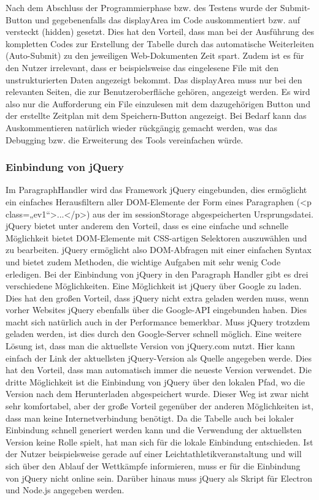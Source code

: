 {Nach dem Abschluss der Programmierphase bzw. des Testens wurde der Submit-Button und gegebenenfalls das displayArea im Code auskommentiert bzw. auf versteckt (hidden) gesetzt. Dies hat den Vorteil, dass man bei der Ausführung des kompletten Codes zur Erstellung der Tabelle durch das automatische Weiterleiten (Auto-Submit) zu den jeweiligen Web-Dokumenten Zeit spart. Zudem ist es für den Nutzer irrelevant, dass er beispielsweise das eingelesene File mit den unstrukturierten Daten angezeigt bekommt. Das displayArea muss nur bei den relevanten Seiten, die zur Benutzeroberfläche gehören, angezeigt werden. Es wird also nur die Aufforderung ein File einzulesen mit dem dazugehörigen Button und der erstellte Zeitplan mit dem Speichern-Button angezeigt. 
Bei Bedarf kann das Auskommentieren natürlich wieder rückgängig gemacht werden, was das Debugging bzw. die Erweiterung des Tools vereinfachen würde. 

\subsubsection{Einbindung von jQuery}
Im ParagraphHandler wird das Framework jQuery eingebunden, dies ermöglicht ein einfaches Herausfiltern aller DOM-Elemente der Form eines Paragraphen (<p class=„ev1“>...</p>) aus der im sessionStorage abgespeicherten Ursprungsdatei. jQuery bietet unter anderem den Vorteil, dass es eine einfache und schnelle Möglichkeit bietet DOM-Elemente mit CSS-artigen Selektoren auszuwählen und zu bearbeiten. jQuery ermöglicht also DOM-Abfragen mit einer einfachen Syntax und bietet zudem Methoden, die wichtige Aufgaben mit sehr wenig Code erledigen. Bei der Einbindung von jQuery in den Paragraph Handler gibt es drei verschiedene Möglichkeiten. Eine Möglichkeit ist jQuery über Google zu laden. Dies hat den großen Vorteil, dass jQuery nicht extra geladen werden muss, wenn vorher Websites jQuery ebenfalls über die Google-API eingebunden haben. Dies macht sich natürlich auch in der Performance bemerkbar. Muss jQuery trotzdem geladen werden, ist dies durch den Google-Server schnell möglich. Eine weitere Lösung ist, dass man die aktuellste Version von jQuery.com nutzt. Hier kann einfach der Link der aktuellsten jQuery-Version als Quelle angegeben werde. Dies hat den Vorteil, dass man automatisch immer die neueste Version verwendet. Die dritte Möglichkeit ist die Einbindung von jQuery über den lokalen Pfad, wo die Version nach dem Herunterladen abgespeichert wurde. Dieser Weg ist zwar nicht sehr komfortabel, aber der große Vorteil gegenüber der anderen Möglichkeiten ist, dass man keine Internetverbindung benötigt. Da die Tabelle auch bei lokaler Einbindung schnell generiert werden kann und die Verwendung der aktuellsten Version keine Rolle spielt, hat man sich für die lokale Einbindung entschieden. Ist der Nutzer beispielsweise gerade auf einer Leichtathletikveranstaltung und will sich über den Ablauf der Wettkämpfe informieren, muss er für die Einbindung von jQuery nicht online sein. 
Darüber hinaus muss jQuery als Skript für Electron und Node.js angegeben werden. 

}
